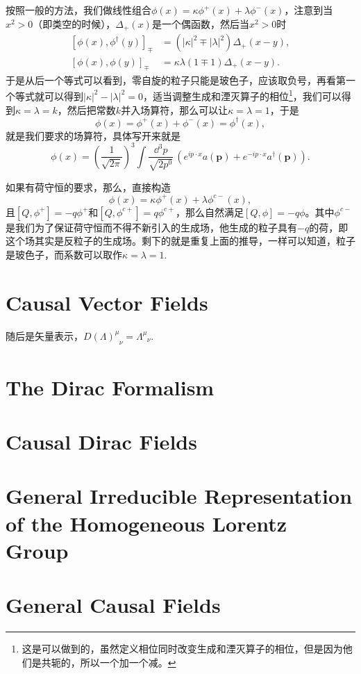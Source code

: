 \documentclass[10pt]{extbook}
\theoremstyle{plain}%
\begin{document}
按照一般的方法，我们做线性组合$\phi(x)=\kappa\phi^+(x)+\lambda\phi^-(x)$，注意到当$x^2>0$（即类空的时候），$\Delta_+(x)$是一个偶函数，然后当$x^2>0$时
\[
\begin{split}
	[\phi(x),\phi^\dag(y)]_{\mp}&=(|\kappa|^2\mp |\lambda|^2)\Delta_+(x-y),\\
	[\phi(x),\phi(y)]_{\mp}&=\kappa\lambda(1\mp 1)\Delta_+(x-y).
\end{split}	
\]
于是从后一个等式可以看到，零自旋的粒子只能是玻色子，应该取负号，再看第一个等式就可以得到$|\kappa|^2-|\lambda|^2=0$，适当调整生成和湮灭算子的相位\footnote{这是可以做到的，虽然定义相位同时改变生成和湮灭算子的相位，但是因为他们是共轭的，所以一个加一个减。}，我们可以得到$\kappa=\lambda=k$，然后把常数$k$并入场算符，那么可以让$\kappa=\lambda=1$，于是
\[
	\phi(x)=\phi^+(x)+\phi^-(x)=\phi^\dag(x),
\]
就是我们要求的场算符，具体写开来就是
\[
	\phi(x)=\left(\frac{1}{\sqrt{2\pi}}\right)^{3}\int \frac{\dd^3 p}{\sqrt{2p^0}}\, (e^{ip\cdot x}a(\mathbf{p})+e^{-ip\cdot x}a^\dag(\mathbf{p})).
\]

如果有荷守恒的要求，那么，直接构造
\[
	\phi(x)=\kappa\phi^+(x)+\lambda\phi^{c-}(x),
\]
且$[Q,\phi^+]=-q\phi^+$和$[Q,\phi^{c+}]=q\phi^{c+}$，那么自然满足$[Q,\phi]=-q\phi$。其中$\phi^{c-}$是我们为了保证荷守恒而不得不新引入的生成场，他生成的粒子具有$-q$的荷，即这个场其实是反粒子的生成场。剩下的就是重复上面的推导，一样可以知道，粒子是玻色子，而系数可以取作$\kappa=\lambda=1$.
\section{Causal Vector Fields}
随后是矢量表示，$D(\Lambda)^\mu_{\phantom{\mu}\nu}=\Lambda^\mu_{\phantom{\mu}\nu}$.
\section{The Dirac Formalism}

\section{Causal Dirac Fields}

\section{General Irreducible Representation of the Homogeneous Lorentz Group}

\section{General Causal Fields}
\end{document}
